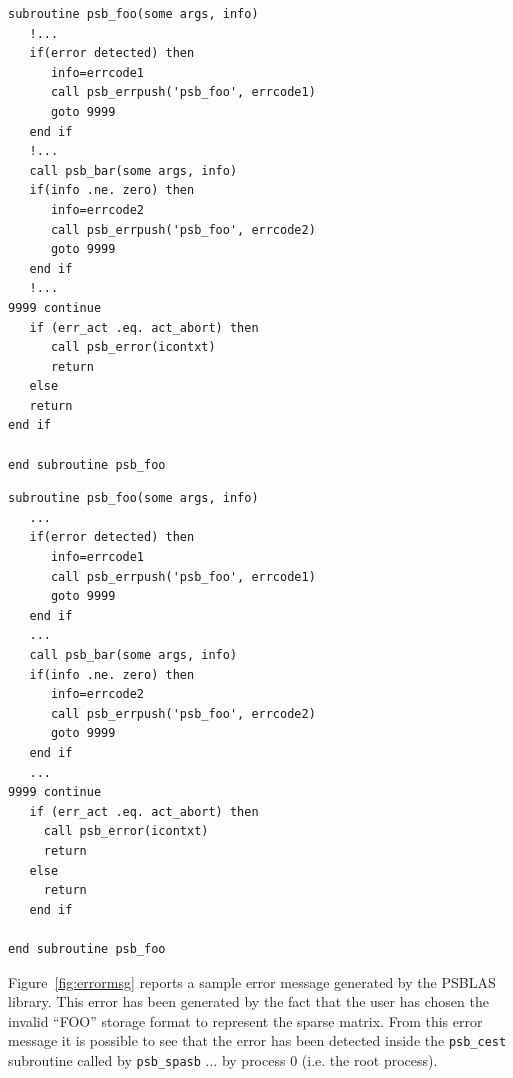 \begin{listing}[h!]
\ifpdf
\begin{verbatim}
subroutine psb_foo(some args, info)
   !...
   if(error detected) then
      info=errcode1
      call psb_errpush('psb_foo', errcode1)
      goto 9999
   end if
   !...
   call psb_bar(some args, info)
   if(info .ne. zero) then
      info=errcode2
      call psb_errpush('psb_foo', errcode2)
      goto 9999
   end if
   !...
9999 continue
   if (err_act .eq. act_abort) then
      call psb_error(icontxt)
      return
   else
   return
end if

end subroutine psb_foo
\end{verbatim}
\else
  \begin{Sbox}
    \begin{minipage}[tl]{0.95\textwidth}
\small
\begin{lstlisting}
subroutine psb_foo(some args, info)
   ...
   if(error detected) then
      info=errcode1
      call psb_errpush('psb_foo', errcode1)
      goto 9999
   end if
   ...
   call psb_bar(some args, info)
   if(info .ne. zero) then
      info=errcode2
      call psb_errpush('psb_foo', errcode2)
      goto 9999
   end if
   ...
9999 continue
   if (err_act .eq. act_abort) then
     call psb_error(icontxt)
     return
   else
     return
   end if

end subroutine psb_foo
\end{lstlisting}
    \end{minipage}
  \end{Sbox}
  \setlength{\fboxsep}{8pt}
  \begin{center}
    \fbox{\TheSbox}
  \end{center}
\fi
  \caption{\label{fig:routerr}The layout of a generic \texttt{psb\_foo}
  routine with respect to PSBLAS-2.0 error handling policy.}
\end{listing}




Figure~\ref{fig:errormsg} reports a sample error message generated by
the PSBLAS library. This error has been generated by the fact that
the user has chosen the invalid ``FOO'' storage format to represent
the sparse matrix. From this error message it is possible to see that
the error has been detected inside the \verb|psb_cest| subroutine
called by \verb|psb_spasb| ... by process 0 (i.e. the root process).


